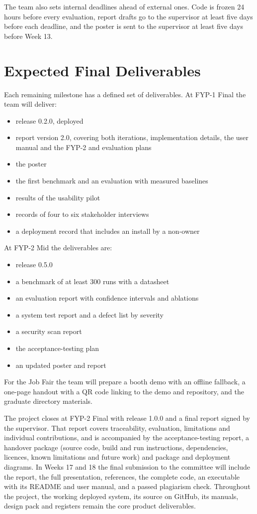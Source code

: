 The team also sets internal deadlines ahead of external ones. Code is frozen 24 hours before every evaluation, report drafts go to the supervisor at least five days before each deadline, and the poster is sent to the supervisor at least five days before Week 13.

\section{Expected Final Deliverables}

Each remaining milestone has a defined set of deliverables. At FYP-1 Final the team will deliver:

\begin{itemize}
\item release 0.2.0, deployed
\item report version 2.0, covering both iterations, implementation details, the user manual and the FYP-2 and evaluation plans
\item the poster
\item the first benchmark and an evaluation with measured baselines
\item results of the usability pilot
\item records of four to six stakeholder interviews
\item a deployment record that includes an install by a non-owner
\end{itemize}

At FYP-2 Mid the deliverables are:

\begin{itemize}
\item release 0.5.0
\item a benchmark of at least 300 runs with a datasheet
\item an evaluation report with confidence intervals and ablations
\item a system test report and a defect list by severity
\item a security scan report
\item the acceptance-testing plan
\item an updated poster and report
\end{itemize}

For the Job Fair the team will prepare a booth demo with an offline fallback, a one-page handout with a QR code linking to the demo and repository, and the graduate directory materials.

The project closes at FYP-2 Final with release 1.0.0 and a final report signed by the supervisor. That report covers traceability, evaluation, limitations and individual contributions, and is accompanied by the acceptance-testing report, a handover package (source code, build and run instructions, dependencies, licences, known limitations and future work) and package and deployment diagrams. In Weeks 17 and 18 the final submission to the committee will include the report, the full presentation, references, the complete code, an executable with its README and user manual, and a passed plagiarism check. Throughout the project, the working deployed system, its source on GitHub, its manuals, design pack and registers remain the core product deliverables.

